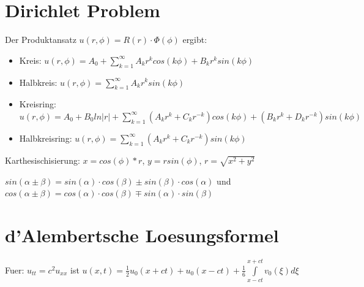 \documentclass[10pt,a4paper]{article}
\begin{document}
\section{Dirichlet Problem}
Der Produktansatz $u(r, \phi) = R(r) \cdot \Phi(\phi)$ ergibt:
\begin{itemize}
\item
Kreis: $u(r, \phi) = A_0 + \sum\limits_{k=1}^\infty A_k r^k cos(k \phi) + B_k r^k sin(k \phi)$
\item
Halbkreis: $u(r, \phi) = \sum\limits_{k=1}^\infty A_k r^k sin(k \phi)$
\item
Kreisring: $u(r, \phi) = A_0 + B_0 ln|r| + \sum\limits_{k=1}^\infty \left(A_k r^k + C_k r^{-k} \right) cos(k \phi) + \left(B_k r^k + D_k r^{-k} \right) sin(k \phi)$
\item
Halbkreisring: $u(r, \phi) = \sum\limits_{k=1}^\infty \left(A_k r^k + C_k r^{-k} \right) sin(k \phi)$
\end{itemize}

Karthesischisierung: $x = cos(\phi)*r$, $y = r sin(\phi)$, $r = \sqrt{x^2 + y^2}$

$sin(\alpha \pm \beta) = sin(\alpha)\cdot cos(\beta) \pm sin(\beta)\cdot cos(\alpha)$ und $cos(\alpha \pm \beta) = cos(\alpha)\cdot cos(\beta) \mp sin(\alpha)\cdot sin(\beta)$

\section{d'Alembertsche Loesungsformel}
Fuer: $u_{tt} = c^2 u_{xx}$ ist $u(x,t) = \frac{1}{2}u_0(x+ct) + u_0(x-ct) + \frac{1}{6}\int\limits_{x-ct}^{x+ct} v_0\left(\xi\right) d \xi $
\end{document}
